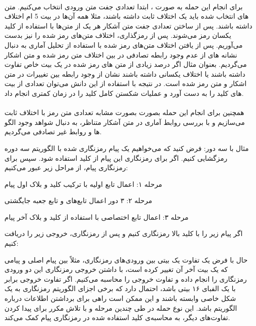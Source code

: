 \paragraph{}
برای انجام این حمله به صورت 
، ابتدا تعدادی جفت متن ورودی انتخاب می‌کنیم. متن های انتخاب شده باید یک اختلاف ثابت داشته باشند، مثلا همه آن‌ها در بیت 5 ام اختلاف داشته باشند. پس از ساختن تعدادی جفت متن آشکار هر یک از متن‌ها با استفاده از کلید یکسان رمز می‌شوند. پس از رمزگذاری، اختلاف متن‌های رمز شده را نیز بدست می‌آوریم. پس از یافتن اختلاف متن‌های رمز شده با استفاده از تحلیل آماری به دنبال نشانه های از عدم وجود رابطه تصادفی در بین اختلاف متن رمز شده و متن اشکار می‌گردیم. بعنوان مثال اگر درصد زیادی از متن های رمز شده در یک بیت خاص تفاوت داشته باشند یا اختلاف یکسانی داشته باشند نشان از وجود رابطه بین تغییرات در متن اشکار و متن رمز شده است. در نتیجه با استفاده از این دانش می‌توان تعدادی از بیت های کلید را به دست آورد و عملیات شکستن کامل کلید را در زمان کمتری انجام داد.

\paragraph{}
همچنین برای انجام این حمله بصورت 
بصورت مشابه تعدادی متن رمز با اختلاف ثابت می‌سازیم و با بررسی روابط آماری در متن آشکار متناظر، 
به دنبال شواهد وجود الگو ها و روابط غیر تصادفی می‌گردیم.


مثال با 
سه دور:
فرض کنید که می‌خواهیم یک پیام رمزنگاری شده با الگوریتم 
 سه دوره رمزگشایی کنیم. اگر برای  رمزنگاری این پیام از کلید
 استفاده شود.
سپس برای رمزنگاری پیام، از مراحل زیر عبور می‌کنیم:

مرحله ۱: اعمال تابع اولیه با ترکیب کلید و بلاک اول پیام

مرحله ۲: ۳ دور اعمال تابع‌های 
و تابع جعبه جایگشتی

مرحله ۳: اعمال تابع اختصاصی با استفاده از کلید و بلاک آخر پیام

اگر پیام زیر را با کلید بالا رمزنگاری کنیم
و پس از رمزنگاری، خروجی زیر را دریافت کنیم:

حال با فرض یک تفاوت یک بیتی بین ورودی‌های رمزنگاری، مثلاً بین پیام اصلی و پیامی که یک بیت آخر آن تغییر کرده است، با داشتن خروجی رمزنگاری این دو ورودی رمزنگاری را انجام داده و تفاوت خروجی را محاسبه می‌کنیم. اگر تفاوت خروجی برابر با یک الفبای ۱۶
بیتی باشد، احتمال دارد که برخی اجزای الگوریتم رمزنگاری به یک شکل خاصی وابسته باشند و این ممکن است راهی برای برداشتن اطلاعات درباره الگوریتم باشد. این نوع حمله در طی چندین مرحله و با تلاش مکرر برای پیدا کردن تفاوت‌های دیگر، به محاسبه‌ی کلید استفاده شده در رمزنگاری پیام کمک می‌کند.

